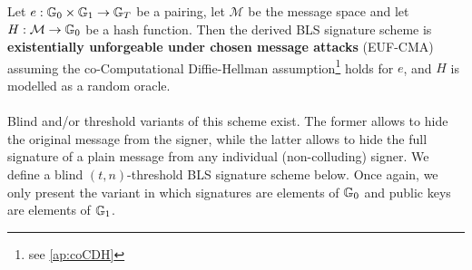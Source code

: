 \begin{theorem} \label{th:blsforge}
	Let $e : \mathbb{G}_0 \times \mathbb{G}_1 \rightarrow \mathbb{G}_T$ be a pairing, let $\mathcal{M}$ be the message space and let $H: \mathcal{M} \rightarrow \mathbb{G}_0$ be a hash function. Then the derived BLS signature scheme is \textbf{existentially unforgeable under chosen message attacks} (EUF-CMA) assuming the co-Computational Diffie-Hellman assumption\footnote{see \autoref{ap:coCDH}} holds for $e$, and $H$ is modelled as a random oracle.
\end{theorem} 

\paragraph{} Blind and/or threshold variants of this scheme exist. The former allows to hide the original message from the signer, while the latter allows to hide the full signature of a plain message from any individual (non-colluding) signer. We define a blind $(t,n)$-threshold BLS signature scheme below. Once again, we only present the variant in which signatures are elements of $\mathbb{G}_0$ and public keys are elements of $\mathbb{G}_1$. 

